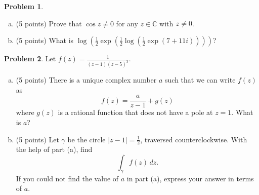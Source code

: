 \documentclass[11pt,oneside]{amsart}
\theoremstyle{definition}
\newtheorem{problem}{Problem}
\newcommand{\bC}{\mathbb{C}}
\let\Im\relax
\DeclareMathOperator{\Im}{Im}
\begin{document}
\newpage

\begin{problem}
\leavevmode\begin{enumerate}[(a)]
\item (5 points) Prove that $\cos z\neq 0$ for any $z\in\bC$ with $\Im z\neq 0$.
\vfill
\item (5 points) What is $\log(\frac12\exp(\frac 12\log(\frac12\exp(7+11i))))$?
\vfill
\end{enumerate}
\end{problem}
\newpage

\begin{problem}
  Let $\displaystyle f(z)=\frac{1}{(z-1)(z-5)^3}$.
  \begin{enumerate}[(a)]
     \item (5 points) There is a unique complex number $a$ such that we can write $f(z)$ as
    \[f(z)=\frac a{z-1}+g(z)\]
    where $g(z)$ is a rational function that does not have a pole at $z=1$. What is $a$?
    \vfill
    \item (5 points) Let $\gamma$ be the circle $|z-1|=\frac 12$, traversed counterclockwise. With the help of part (a), find
    \[\int_\gamma f(z)\,dz.\]
    If you could not find the value of $a$ in part (a), express your answer in terms of $a$.
    \vfill
  \end{enumerate}
\end{problem}
\end{document}
